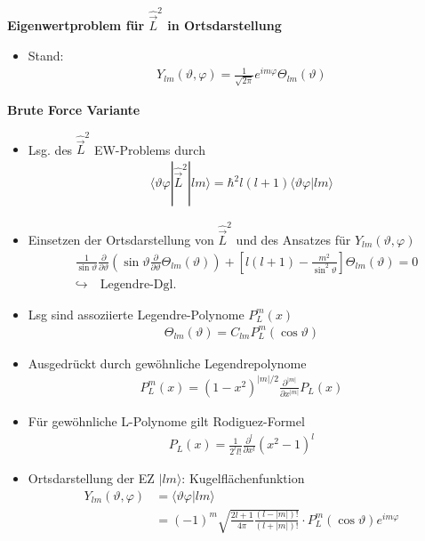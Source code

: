 \documentclass[10pt,article,colorback,accentcolor=tud9d]{scrartcl}
\begin{document}
\noindent\textbf{Eigenwertproblem für $\hat{\vec{L}}^2$ in Ortsdarstellung}
\begin{itemize}
	\item Stand:
    \begin{align}
    Y_{lm}(\vartheta,\varphi)=\frac{1}{\sqrt{2\pi}}e^{im\varphi}\Theta_{lm}(\vartheta)
    \end{align}
\end{itemize}
\textbf{Brute Force Variante}
\begin{itemize}
	\item Lsg. des $\hat{\vec{L}}^2$ EW-Problems durch 
    \begin{align}
    \langle\vartheta\varphi|\hat{\vec{L}}^2|lm\rangle=\hbar^2l(l+1)\langle\vartheta\varphi|lm\rangle
    \end{align}
  \item Einsetzen der Ortsdarstellung von $\hat{\vec{L}}^2$ und des Ansatzes für $Y_{lm}(\vartheta,\varphi)$
    \begin{align}
    &\frac{1}{\sin\vartheta}\frac{\partial}{\partial\vartheta}\left(\sin\vartheta\frac{\partial}{\partial\vartheta}\Theta_{lm}(\vartheta)\right)+\left[l(l+1)-\frac{m^2}{\sin^2\vartheta}\right]\Theta_{lm}(\vartheta)=0\\
    &\hookrightarrow \quad \text{Legendre-Dgl.} \nonumber
    \end{align}
  \item Lsg sind assoziierte Legendre-Polynome $P^m_L(x)$
    \begin{align}
    \Theta_{lm}(\vartheta)=C_{lm}P^m_L(\cos\vartheta)
    \end{align}
  \item Ausgedrückt durch gewöhnliche Legendrepolynome
    \begin{align}
    P_L^m(x)=(1-x^2)^{|m|/2}\frac{\partial^{|m|}}{\partial x^{|m|}}P_L(x)
    \end{align}
  \item Für gewöhnliche L-Polynome gilt Rodiguez-Formel
    \begin{align}
    P_L(x)=\frac{1}{2^ll!}\frac{\partial^l}{\partial x^l}(x^2-1)^l
    \end{align}
  \item Ortsdarstellung der EZ $|lm\rangle$: Kugelflächenfunktion
    \begin{align}
    Y_{lm}(\vartheta,\varphi)&=\langle\vartheta\varphi|lm\rangle\\
    &=(-1)^m\sqrt{\frac{2l+1}{4\pi}\frac{(l-|m|)!}{(l+|m|)!}}\cdot P^m_L(\cos \vartheta)e^{im\varphi}
   \end{align}
\end{itemize}
\end{document}

